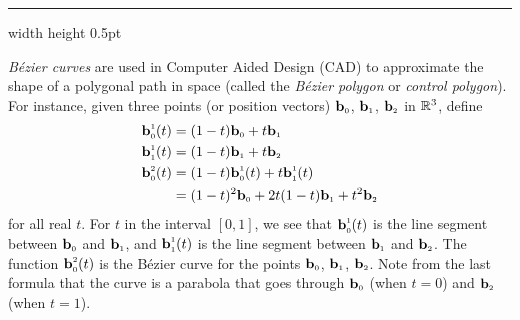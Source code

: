 \vspace{2mm}
\hrule width \textwidth height 0.5pt
\begin{exmp}\label{exmp:bezier}
 \emph{B\'{e}zier curves} are used in Computer Aided Design (CAD) to approximate the shape of a
 polygonal path in space (called the \emph{B\'{e}zier polygon} or \emph{control polygon}). For instance, given three
 points (or position vectors) $\textbf{b}_{\scriptscriptstyle 0}$, $\textbf{b}_{\scriptscriptstyle 1}$, $\textbf{b}_{\scriptscriptstyle 2}$ in $\mathbb{R}^{3}$,
 define
 \begin{align*}
  \ssub{\textbf{b}}{0}^{\scriptscriptstyle 1}(t) &= ( 1 - t )\ssub{\textbf{b}}{0} + t \ssub{\textbf{b}}{1}\\
  \ssub{\textbf{b}}{1}^{\scriptscriptstyle 1}(t) &= ( 1 - t )\ssub{\textbf{b}}{1} + t \ssub{\textbf{b}}{2}\vspace{1mm}\\
  \ssub{\textbf{b}}{0}^{\scriptscriptstyle 2}(t) &=
  ( 1 - t )\ssub{\textbf{b}}{0}^{\scriptscriptstyle 1}(t) + t \ssub{\textbf{b}}{1}^{\scriptscriptstyle 1}(t)\\
  &= (1 - t)^2 \ssub{\textbf{b}}{0} + 2t(1 - t) \ssub{\textbf{b}}{1} + t^2 \ssub{\textbf{b}}{2}
 \end{align*}
 for all real $t$. For $t$ in the interval $[0,1]$, we see that $\textbf{b}_{\scriptscriptstyle 0}^{\scriptscriptstyle 1}(t)$ is the
 line segment between $\textbf{b}_{\scriptscriptstyle 0}$ and $\textbf{b}_{\scriptscriptstyle 1}$, and
 $\textbf{b}_{\scriptscriptstyle 1}^{\scriptscriptstyle 1}(t)$ is the line segment between $\textbf{b}_{\scriptscriptstyle 1}$ and
 $\textbf{b}_{\scriptscriptstyle 2}$. The function $\textbf{b}_{\scriptscriptstyle 0}^{\scriptscriptstyle 2}(t)$ is the
 B\'{e}zier curve for the points $\textbf{b}_{\scriptscriptstyle 0}$, $\textbf{b}_{\scriptscriptstyle 1}$, $\textbf{b}_{\scriptscriptstyle 2}$. Note from the
 last formula that the curve is a parabola that goes through $\textbf{b}_{\scriptscriptstyle 0}$ (when $t = 0$) and
 $\textbf{b}_{\scriptscriptstyle 2}$ (when $t = 1$).
 

\end{exmp}
